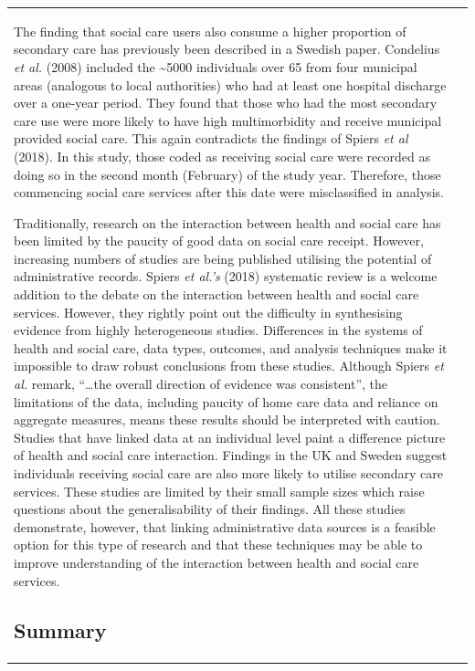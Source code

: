 \documentclass[12pt,a4paper,oneside,table]{report}
\begin{document}
\begin{tabular}[t]{ll}
The finding that social care users also consume a higher proportion of
secondary care has previously been described in a Swedish paper.
Condelius \textit{et al.} (2008) included the \textasciitilde{}5000
individuals over 65 from four municipal areas (analogous to local
authorities) who had at least one hospital discharge over a one-year
period. They found that those who had the most secondary care use were
more likely to have high multimorbidity and receive municipal provided
social care. This again contradicts the findings of Spiers \emph{et al}
(2018). In this study, those coded as receiving social care were
recorded as doing so in the second month (February) of the study year.
Therefore, those commencing social care services after this date were
misclassified in analysis.

Traditionally, research on the interaction between health and social
care has been limited by the paucity of good data on social care
receipt. However, increasing numbers of studies are being published
utilising the potential of administrative records. Spiers
\textit{et al.'s} (2018) systematic review is a welcome addition to the
debate on the interaction between health and social care services.
However, they rightly point out the difficulty in synthesising evidence
from highly heterogeneous studies. Differences in the systems of health
and social care, data types, outcomes, and analysis techniques make it
impossible to draw robust conclusions from these studies. Although
Spiers \textit{et al.} remark, ``\ldots{}the overall direction of
evidence was consistent'', the limitations of the data, including
paucity of home care data and reliance on aggregate measures, means
these results should be interpreted with caution. Studies that have
linked data at an individual level paint a difference picture of health
and social care interaction. Findings in the UK and Sweden suggest
individuals receiving social care are also more likely to utilise
secondary care services. These studies are limited by their small sample
sizes which raise questions about the generalisability of their
findings. All these studies demonstrate, however, that linking
administrative data sources is a feasible option for this type of
research and that these techniques may be able to improve understanding
of the interaction between health and social care services.

\subsection{Summary}\label{subsec:hsc-interaction-summary}


\end{tabular}
\end{document}
